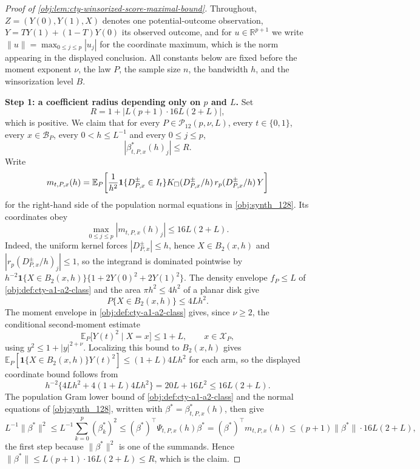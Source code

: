 \begin{proof}[Proof of \cref{obj:lem:cty-winsorized-score-maximal-bound}]
Throughout, \(Z=(Y(0),Y(1),X)\) denotes one potential-outcome observation, \(Y=TY(1)+(1-T)Y(0)\) its observed outcome, and for \(u\in\mathbb R^{p+1}\) we write \(\lVert u\rVert=\max_{0\leq j\leq p}|u_j|\) for the coordinate maximum, which is the norm appearing in the displayed conclusion.  All constants below are fixed before the moment exponent \(\nu\), the law \(P\), the sample size \(n\), the bandwidth \(h\), and the winsorization level \(B\).

\textbf{Step 1: a coefficient radius depending only on \(p\) and \(L\).}  Set
\[
R=1+\left|L(p+1)\cdot 16L(2+L)\right|,
\]
which is positive.  We claim that for every \(P\in\mathcal P_{12}(p,\nu,L)\), every \(t\in\{0,1\}\), every \(x\in\mathcal B_P\), every \(0<h\leq L^{-1}\) and every \(0\leq j\leq p\),
\[
\left|\beta^*_{t,P,x}(h)_j\right|\leq R .
\]
Write
\[
m_{t,P,x}(h)
=
\mathbb E_P\!\left[
{1\over h^2}\mathbf 1\{D^{\pm}_{P,x}\in I_t\}
K_\square(D^{\pm}_{P,x}/h)\,r_p(D^{\pm}_{P,x}/h)\,Y
\right]
\]
for the right-hand side of the population normal equations in \cref{obj:synth_128}.  Its coordinates obey
\[
\max_{0\leq j\leq p}\left|m_{t,P,x}(h)_j\right|\leq 16L(2+L).
\]
Indeed, the uniform kernel forces \(|D^{\pm}_{P,x}|\leq h\), hence \(X\in B_2(x,h)\) and \(|r_p(D^{\pm}_{P,x}/h)_j|\leq1\), so the integrand is dominated pointwise by \(h^{-2}\mathbf 1\{X\in B_2(x,h)\}\{1+2Y(0)^2+2Y(1)^2\}\).  The density envelope \(f_P\leq L\) of \cref{obj:def:cty-a1-a2-class} and the area \(\pi h^2\leq4h^2\) of a planar disk give
\[
P\{X\in B_2(x,h)\}\leq 4Lh^2 .
\]
The moment envelope in \cref{obj:def:cty-a1-a2-class} gives, since \(\nu\geq2\), the conditional second-moment estimate
\[
\mathbb E_P\bigl[Y(t)^2\mid X=x\bigr]\leq 1+L,
\qquad x\in\mathcal X_P,
\]
using \(y^2\leq 1+|y|^{2+\nu}\).  Localizing this bound to \(B_2(x,h)\) gives \(\mathbb E_P[\mathbf 1\{X\in B_2(x,h)\}Y(t)^2]\leq (1+L)4Lh^2\) for each arm, so the displayed coordinate bound follows from
\[
h^{-2}\bigl\{4Lh^2+4(1+L)4Lh^2\bigr\}
=20L+16L^2
\leq
16L(2+L).
\]
The population Gram lower bound of \cref{obj:def:cty-a1-a2-class} and the normal equations of \cref{obj:synth_128}, written with \(\beta^*=\beta^*_{t,P,x}(h)\), then give
\[
L^{-1}\lVert\beta^*\rVert^2
\leq
L^{-1}\sum_{k=0}^p(\beta^*_k)^2
\leq
(\beta^*)^\top\Psi_{t,P,x}(h)\beta^*
=
(\beta^*)^\top m_{t,P,x}(h)
\leq
(p+1)\lVert\beta^*\rVert\cdot 16L(2+L),
\]
the first step because \(\lVert\beta^*\rVert^2\) is one of the summands.  Hence \(\lVert\beta^*\rVert\leq L(p+1)\cdot16L(2+L)\leq R\), which is the claim.


\end{proof}

